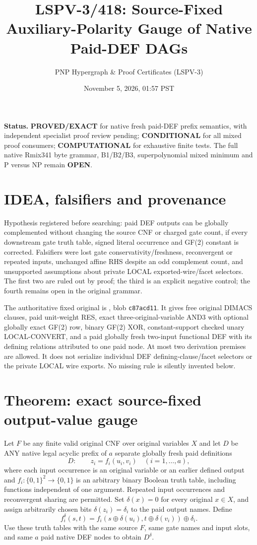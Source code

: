 \documentclass[11pt]{article}
\title{LSPV-3/418: Source-Fixed Auxiliary-Polarity Gauge of Native Paid-DEF DAGs}
\author{PNP Hypergraph \& Proof Certificates (LSPV-3)}
\date{November 5, 2026, 01:57 PST}
\begin{document}
\maketitle
\noindent\textbf{Status.} \textbf{PROVED/EXACT} for native fresh paid-DEF prefix semantics, with independent specialist proof review pending; \textbf{CONDITIONAL} for all mixed proof consumers; \textbf{COMPUTATIONAL} for exhaustive finite tests. The full native Rmix341 byte grammar, B1/B2/B3, superpolynomial mixed minimum and P versus NP remain \textbf{OPEN}.

\section*{IDEA, falsifiers and provenance}
Hypothesis registered before searching: paid DEF outputs can be globally complemented without changing the source CNF or charged gate count, if every downstream gate truth table, signed literal occurrence and GF(2) constant is corrected. Falsifiers were lost gate conservativity/freshness, reconvergent or repeated inputs, unchanged affine RHS despite an odd complement count, and unsupported assumptions about private LOCAL exported-wire/facet selectors. The first two are ruled out by proof; the third is an explicit negative control; the fourth remains open in the original grammar.

The authoritative fixed original is , blob \texttt{c87acd11}. It gives free original DIMACS clauses, paid unit-weight RES, exact three-original-variable AND3 with optional globally exact GF(2) row, binary GF(2) XOR, constant-support checked unary LOCAL-CONVERT, and a paid globally fresh two-input functional DEF with its defining relations attributed to one paid node. At most two derivation premises are allowed. It does not serialize individual DEF defining-clause/facet selectors or the private LOCAL wire exports. No missing rule is silently invented below.

\section*{Theorem: exact source-fixed output-value gauge}
Let $F$ be any finite valid original CNF over original variables $X$ and let $D$ be ANY native legal acyclic prefix of $a$ separate globally fresh paid definitions
\[
D:\qquad z_i=f_i(u_i,v_i)\quad (i=1,\ldots,a),
\]
where each input occurrence is an original variable or an earlier defined output and $f_i:\{0,1\}^2\to\{0,1\}$ is an arbitrary binary Boolean truth table, including functions independent of one argument. Repeated input occurrences and reconvergent sharing are permitted. Set $\delta(x)=0$ for every original $x\in X$, and assign arbitrarily chosen bits $\delta(z_i)=\delta_i$ to the paid output names. Define
\[
\boxed{f_i^\delta(s,t)=f_i(s\oplus\delta(u_i),t\oplus\delta(v_i))\oplus\delta_i}.
\]
Use these truth tables with the same source $F$, same gate names and input slots, and same $a$ paid native DEF nodes to obtain $D^\delta$.
\end{document}
